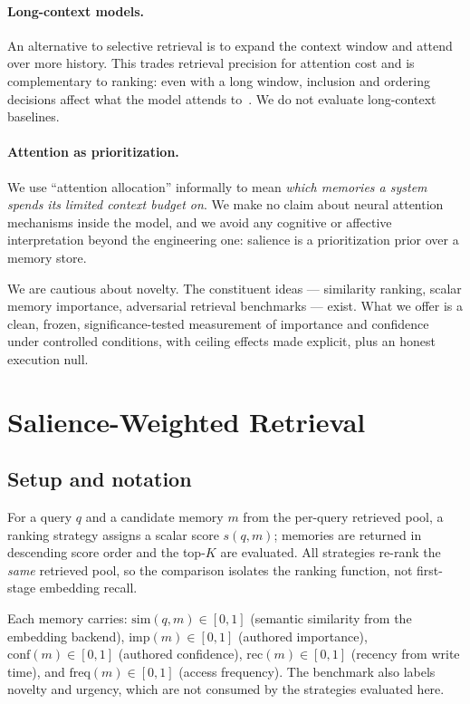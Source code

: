 \documentclass[11pt]{article}
\begin{document}
\paragraph{Long-context models.} An alternative to selective retrieval is to expand the
context window and attend over more history. This trades retrieval precision for attention
cost and is complementary to ranking: even with a long window, inclusion and ordering
decisions affect what the model attends to~\cite{liu2024lostinthemiddle}. We do not
evaluate long-context baselines.

\paragraph{Attention as prioritization.} We use ``attention allocation'' informally to
mean \emph{which memories a system spends its limited context budget on}. We make no claim
about neural attention mechanisms inside the model, and we avoid any cognitive or affective
interpretation beyond the engineering one: salience is a prioritization prior over a memory
store.

We are cautious about novelty. The constituent ideas --- similarity ranking, scalar memory
importance, adversarial retrieval benchmarks --- exist. What we offer is a clean, frozen,
significance-tested measurement of importance and confidence under controlled conditions,
with ceiling effects made explicit, plus an honest execution null.

\section{Salience-Weighted Retrieval}
\label{sec:method}

\subsection{Setup and notation}
For a query $q$ and a candidate memory $m$ from the per-query retrieved pool, a ranking
strategy assigns a scalar score $s(q, m)$; memories are returned in descending score order
and the top-$K$ are evaluated. All strategies re-rank the \emph{same} retrieved pool, so
the comparison isolates the ranking function, not first-stage embedding recall.

Each memory carries: $\mathrm{sim}(q, m)\in[0,1]$ (semantic similarity from the embedding
backend), $\mathrm{imp}(m)\in[0,1]$ (authored importance), $\mathrm{conf}(m)\in[0,1]$
(authored confidence), $\mathrm{rec}(m)\in[0,1]$ (recency from write time), and
$\mathrm{freq}(m)\in[0,1]$ (access frequency). The benchmark also labels novelty and
urgency, which are not consumed by the strategies evaluated here.
\end{document}
